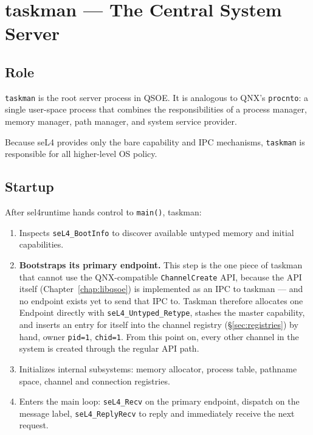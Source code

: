 \chapter{taskman --- The Central System Server}

\section{Role}

\texttt{taskman} is the root server process in QSOE.  It is analogous
to QNX's \texttt{procnto}: a single user-space process that
combines the responsibilities of a process manager, memory manager,
path manager, and system service provider.

Because seL4 provides only the bare capability and IPC mechanisms,
\texttt{taskman} is responsible for all higher-level OS policy.

\section{Startup}
\label{sec:taskman-startup}

After sel4runtime hands control to \texttt{main()}, taskman:

\begin{enumerate}
    \item Inspects \texttt{seL4\_BootInfo} to discover available untyped
          memory and initial capabilities.
    \item \textbf{Bootstraps its primary endpoint.}  This step is the
          one piece of taskman that cannot use the QNX-compatible
          \texttt{ChannelCreate} API, because the API itself
          (Chapter~\ref{chap:libqsoe}) is implemented as an IPC to
          taskman --- and no endpoint exists yet to send that IPC to.
          Taskman therefore allocates one Endpoint directly with
          \texttt{seL4\_Untyped\_Retype}, stashes the master capability,
          and inserts an entry for itself into the channel registry
          (\S\ref{sec:registries}) by hand, owner \texttt{pid=1},
          \texttt{chid=1}.  From this point on, every other channel in
          the system is created through the regular API path.
    \item Initializes internal subsystems: memory allocator, process
          table, pathname space, channel and connection registries.
    \item Enters the main loop: \texttt{seL4\_Recv} on the primary
          endpoint, dispatch on the message label, \texttt{seL4\_ReplyRecv}
          to reply and immediately receive the next request.
\end{enumerate}


